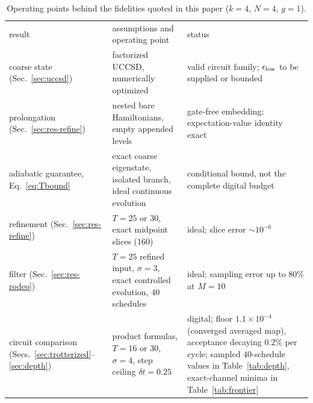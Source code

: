 \documentclass[aps,prc,reprint,superscriptaddress,floatfix,nofootinbib]{revtex4-2}
\begin{document}
\begin{table}[t]
\caption{\label{tab:ops}Operating points behind the fidelities quoted in
this paper ($k=4$, $N=4$, $g=1$).}
\footnotesize
\begin{ruledtabular}
\begin{tabular}{p{}p{}p{}}
result & assumptions and operating point & status\\
\colrule
coarse state (Sec.~\ref{sec:uccsd}) & factorized UCCSD, numerically optimized & valid circuit family; $\epsilon_{\rm low}$ to be supplied or bounded\\
prolongation (Sec.~\ref{sec:res-refine}) & nested bare Hamiltonians, empty appended levels & gate-free embedding; expectation-value identity exact\\
adiabatic guarantee, Eq.~\eqref{eq:Tbound} & exact coarse eigenstate, isolated branch, ideal continuous evolution & conditional bound, not the complete digital budget\\
refinement (Sec.~\ref{sec:res-refine}) & $T=25$ or $30$, exact midpoint slices ($160$) & ideal; slice error $\sim10^{-6}$\\
filter (Sec.~\ref{sec:res-rodeo}) & $T=25$ refined input, $\sigma=3$, exact controlled evolution, $40$ schedules & ideal; sampling error up to $80\%$ at $M=10$\\
circuit comparison (Secs.~\ref{sec:trotterized}--\ref{sec:depth}) & product formulas, $T=16$ or $30$, $\sigma=4$, step ceiling $\delta t=0.25$ & digital; floor $1.1\times10^{-4}$ (converged averaged map), acceptance decaying $0.2\%$ per cycle; sampled $40$-schedule values in Table~\ref{tab:depth}, exact-channel minima in Table~\ref{tab:frontier}\\
\end{tabular}
\end{ruledtabular}
\end{table}
\end{document}
